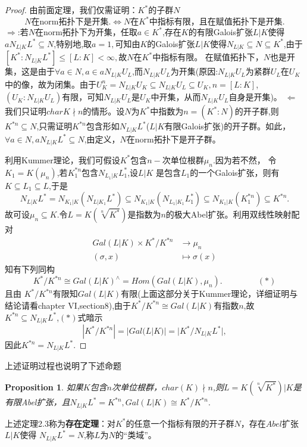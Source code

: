 \documentclass[UTF8]{article}
\newtheorem{prop}{Proposition}[section]
\begin{document}
\begin{proof}
	由前面定理，我们仅需证明：$K^{*}$的子群$N$
	$$
	N\text{在norm拓扑下是开集.}\Longleftrightarrow N\text{在}K^{*}\text{中指标有限，且在赋值拓扑下是开集.}
	$$
	$\Rightarrow$:若$N$在norm拓扑下为开集，任取$a\in K^{*}$,存在$K$的有限Galois扩张$L|K$使得$aN_{L|K}L^{*}\subseteq N$,特别地,取$a=1,$可知由$K$的Galois扩张$L|K$使得$N_{L|K}\subseteq N\subseteq K^{*}$,由于$[K^{*}:N_{L|K}L^{*}]\leq [L:K]<\infty,$故$N$在$K^{*}$中指标有限。
	在赋值拓扑下，$N$也是开集，这是由于$\forall a\in N,a\in aN_{L|K}U_{L}$,而$N_{L|K}U_{L}$为开集(原因:$N_{L|K}U_{L}$为紧群$U_{L}$在$U_{K}$中的像，故为闭集。由于$U_{K}^{n}=N_{L|K}U_{K}\subseteq N_{L|K}U_{L}\subseteq U_{K},n=[L:K]$,$(U_{K}:N_{L|K}U_{L})$有限，可知$N_{L|K}U_{L}$是$U_{K}$中开集，从而$N_{L|K}U_{L}$自身是开集)。
	$\Leftarrow$我们只证明$char{K}\nmid n$的情形。设$N$为$K^{*}$中指数为$n=(K^{*}:N)$的开子群,则$K^{*n}\subseteq N$,只需证明$K^{*n}$包含形如$N_{L|K}L^{*}$($L|K$有限Galois扩张)的开子群。如此，$\forall a\in N,aN_{L|K}L^{*}\subseteq N$,由定义，$N$在norm拓扑下是开子群。
	
	 利用Kummer理论，我们可假设$K^{*}$包含$n-$次单位根群$\mu_{n}$.因为若不然，
	 令$K_{1}=K(\mu_{n})$,若$K_{1}^{*n}$包含$N_{L_{1}|K}L_{1}^{*}$,设$L|K$
是包含$L_{1}$的一个Galois扩张，则有$K\subseteq L_{1}\subseteq L$,于是
$$
N_{L|K}L^{*}=N_{K_{1}|K}(N_{L|K_{1}}L^{*})\subseteq N_{K_{1}|K}(N_{L_{1}|K_{1}}L_{1}^{*})\subseteq N_{K_{1}|K}(K_{1}^{*n})\subseteq K^{*n}.
$$	
故可设$\mu_{n}\subseteq K.$令$L=K(\sqrt[n]{K^{*}})$是指数为$n$的极大Abel扩张。利用双线性映射配对
\[
\begin{split}
Gal(L|K)\times K^{*}/K^{*n}&\longrightarrow \mu_{n} \\
(\sigma,x)&\mapsto \sigma(x)
\end{split}
\]
知有下列同构
$$K^{*}/K^{*n}\cong Gal(L|K)^{\wedge}=Hom(Gal(L|K),\mu_{n}).\qquad \qquad \ (*)$$
且由
$K^{*}/K^{*n}$有限知$Gal(L|K)$有限(上面这部分关于Kummer理论，详细证明与结论请看\cite{lang}chapter VI,section8),由于$K^{*}/K^{*n}\cong Gal(L|K)$有指数$n$,故
$K^{*n}\subseteq N_{L|K}L^{*}$,$(*)$式暗示$$
|K^{*}/K^{*n}|=|Gal(L|K)|=|K^{*}/N_{L|K}L^{*}|,$$因此$K^{*n}=N_{L|K}L^{*}.$
\end{proof}
上述证明过程也说明了下述命题
\begin{prop}
	如果$K$包含$n$次单位根群，$char(K)\nmid n$,则$L=K(\sqrt[n]{K^{*}})|K$是有限Abel扩张，且$N_{L|K}L^{*}=K^{*n},Gal(L|K)\cong K^{*}/K^{*n}.$
\end{prop}
上述定理2.3称为\textbf{存在定理}：对$K^{*}$的任意一个指标有限的开子群$N$，存在$Abel$扩张$L|K$使得
$N_{L|K}L^{*}=N$,称$L$为$N$的“类域”。
\end{document}
